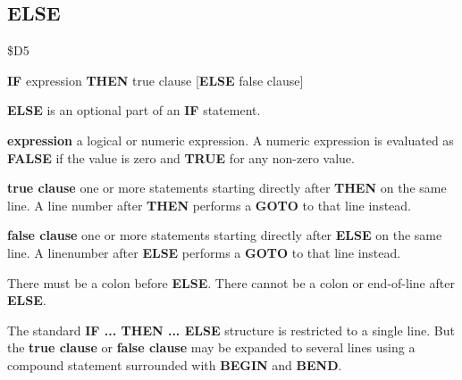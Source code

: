 \subsection{ELSE}
\begin{description}[leftmargin=2cm,style=nextline]
\item [Token:] \$D5
\item [Format:] {\bf IF} expression {\bf THEN} true clause
		[{\bf ELSE} false clause]
\item [Usage:] {\bf ELSE} is an optional part of an {\bf IF}
               statement.

               {\bf expression} a logical or numeric expression.
               A numeric expression is evaluated as {\bf FALSE}
               if the value is zero and {\bf TRUE} for any non-zero
               value.

               {\bf true clause} one or more statements starting
               directly after {\bf THEN} on the same line.
               A line number after {\bf THEN} performs a
               {\bf GOTO} to that line instead.

               {\bf false clause} one or more statements starting
               directly after {\bf ELSE} on the same line.
               A linenumber after {\bf ELSE} performs a
               {\bf GOTO} to that line instead.

\item [Remarks:]
               There must be a colon before {\bf ELSE}.
               There cannot be a colon or end-of-line after {\bf ELSE}.

               The standard {\bf IF ... THEN ... ELSE} structure
               is restricted to a single line. But the {\bf true clause}
               or {\bf false clause} may be expanded to several lines
               using a compound statement surrounded with
               {\bf BEGIN} and {\bf BEND}.


\end{description}
